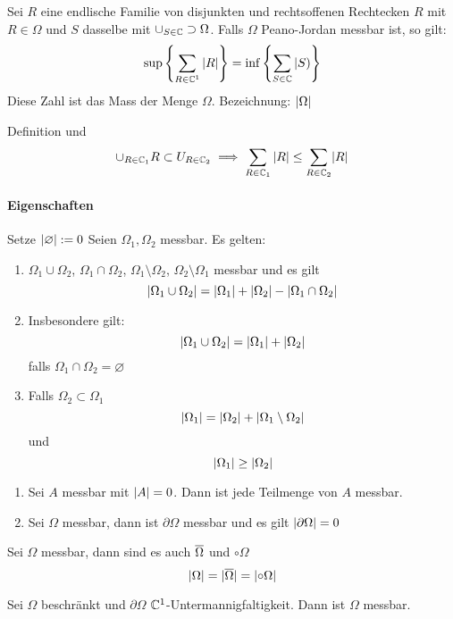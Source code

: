 \begin{Lem}
  Sei $R$ eine endlische Familie von disjunkten und rechtsoffenen Rechtecken $R$ mit $R\in \Omega$ und $S$ dasselbe mit $\cup_{S\in\mathbb{C}}\supset\Omega$.
  Falls $\Omega$ Peano-Jordan messbar ist, so gilt:
  \[\sup \left\{ \sum_{R\in\mathbb{C}^1}\left| R \right| \right\} = \inf \left\{ \sum_{S\in\mathbb{C}}|S) \right\}\]
  Diese Zahl ist das Mass der Menge $\Omega$. Bezeichnung: $\mathopen| \Omega \mathclose|$
\end{Lem}
\begin{Bew}
  Definition und
  \[\cup_{R\in\mathbb{C}_1}R\subset U_{R\in\mathbb{C}_2}\implies\sum_{R\in\mathbb{C}_1}\left| R \right|\leq\sum_{R\in\mathbb{C}_2}\mathopen| R \mathclose|\]
\end{Bew}
\paragraph{Eigenschaften}
\begin{Sat}
  Setze $\mathopen| \varnothing \mathclose|:=0$
  Seien $\Omega_1,\Omega_2$ messbar. Es gelten:
  \begin{enumerate}
    \item $\Omega_1\cup\Omega_2$, $\Omega_1\cap\Omega_2$, $\Omega_1\setminus\Omega_2$, $\Omega_2\setminus\Omega_1$ messbar und es gilt
      \[\mathopen| \Omega_1\cup\Omega_2 \mathclose|=\mathopen| \Omega_1 \mathclose|+\mathopen| \Omega_2 \mathclose|-\mathopen| \Omega_1\cap\Omega_2 \mathclose|\]
    \item Insbesondere gilt:
      \[\mathopen| \Omega_1\cup\Omega_2 \mathclose|=\mathopen| \Omega_1 \mathclose|+\mathopen| \Omega_2 \mathclose|\]
      falls $\Omega_1\cap\Omega_2=\varnothing$
    \item Falls $\Omega_2\subset\Omega_1$
      \[\mathopen| \Omega_1 \mathclose|=\mathopen| \Omega_2 \mathclose|+\mathopen| \Omega_1\setminus\Omega_2 \mathclose|\]
      und
      \[\mathopen| \Omega_1 \mathclose|\geq\mathopen| \Omega_2 \mathclose|\]
  \end{enumerate}
\end{Sat}
\begin{Sat}
  \begin{enumerate}
    \item Sei $A$ messbar mit $\mathopen| A \mathclose|=0$. Dann ist jede Teilmenge von $A$ messbar.
    \item Sei $\Omega$ messbar, dann ist $\partial\Omega$ messbar und es gilt $\mathopen| \partial\Omega \mathclose|=0$
  \end{enumerate}
\end{Sat}
\begin{Kor}
  Sei $\Omega$ messbar, dann sind es auch $\overline{\Omega}$ und $\circ\Omega$
  \[\mathopen| \Omega \mathclose|=\mathopen| \overline{\Omega} \mathclose|=\mathopen| \circ\Omega \mathclose|\] %
\end{Kor}
\begin{Sat}
  Sei $\Omega$ beschränkt und $\partial\Omega$ $\mathbb{C}^1$-Untermannigfaltigkeit. Dann ist $\Omega$ messbar.
\end{Sat}
